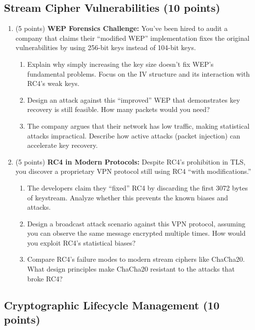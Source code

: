 \documentclass[10pt,a4paper,american]{article}
\begin{document}
\subsection{Stream Cipher Vulnerabilities (10 points)}

\begin{enumerate}
	\item (5 points) \textbf{WEP Forensics Challenge:}
	      You've been hired to audit a company that claims their ``modified WEP'' implementation fixes the original vulnerabilities by using 256-bit keys instead of 104-bit keys.
	      \begin{enumerate}
		      \item Explain why simply increasing the key size doesn't fix WEP's fundamental problems. Focus on the IV structure and its interaction with RC4's weak keys.
		      \item Design an attack against this ``improved'' WEP that demonstrates key recovery is still feasible. How many packets would you need?
		      \item The company argues that their network has low traffic, making statistical attacks impractical. Describe how active attacks (packet injection) can accelerate key recovery.
	      \end{enumerate}
	\item (5 points) \textbf{RC4 in Modern Protocols:}
	      Despite RC4's prohibition in TLS, you discover a proprietary VPN protocol still using RC4 ``with modifications.''
	      \begin{enumerate}
		      \item The developers claim they ``fixed'' RC4 by discarding the first 3072 bytes of keystream. Analyze whether this prevents the known biases and attacks.
		      \item Design a broadcast attack scenario against this VPN protocol, assuming you can observe the same message encrypted multiple times. How would you exploit RC4's statistical biases?
		      \item Compare RC4's failure modes to modern stream ciphers like ChaCha20. What design principles make ChaCha20 resistant to the attacks that broke RC4?
	      \end{enumerate}
\end{enumerate}

\subsection{Cryptographic Lifecycle Management (10 points)}
\end{document}

